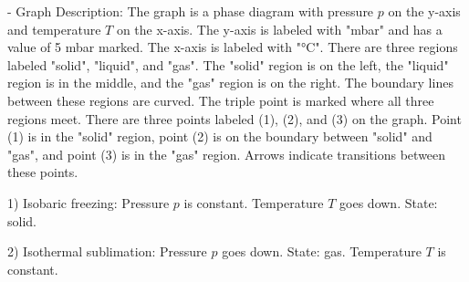 - Graph Description: The graph is a phase diagram with pressure \( p \) on the y-axis and temperature \( T \) on the x-axis. The y-axis is labeled with "mbar" and has a value of 5 mbar marked. The x-axis is labeled with "°C". There are three regions labeled "solid", "liquid", and "gas". The "solid" region is on the left, the "liquid" region is in the middle, and the "gas" region is on the right. The boundary lines between these regions are curved. The triple point is marked where all three regions meet. There are three points labeled (1), (2), and (3) on the graph. Point (1) is in the "solid" region, point (2) is on the boundary between "solid" and "gas", and point (3) is in the "gas" region. Arrows indicate transitions between these points.

1) Isobaric freezing: Pressure \( p \) is constant. Temperature \( T \) goes down. State: solid.

2) Isothermal sublimation: Pressure \( p \) goes down. State: gas. Temperature \( T \) is constant.